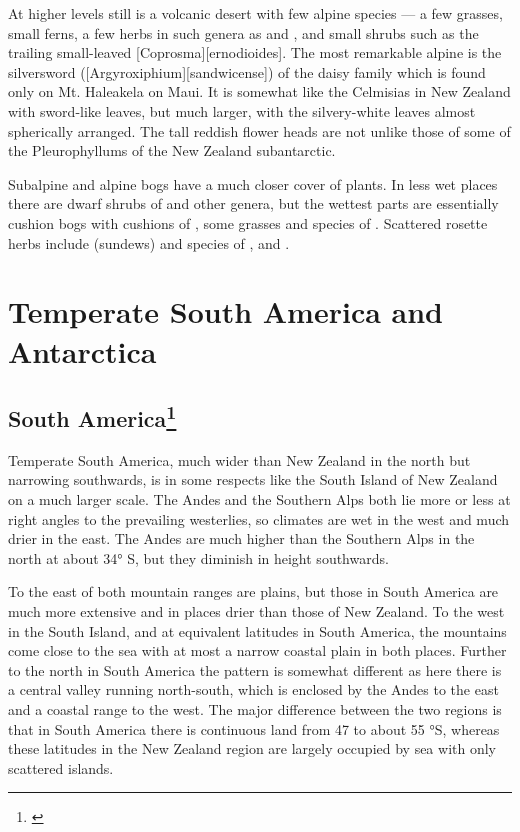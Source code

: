 At higher levels still is a volcanic desert with few alpine species --- a few grasses, small ferns, a few herbs in such genera as  and , and small shrubs such as the trailing small-leaved [Coprosma][ernodioides].
The most remarkable alpine is the silversword ([Argyroxiphium][sandwicense]) of the daisy family which is found only on Mt.
Haleakela on Maui.
It is somewhat like the Celmisias in New Zealand with sword-like leaves, but much larger, with the silvery-white leaves almost spherically arranged.
The tall reddish flower heads are not unlike those of some of the Pleurophyllums of the New Zealand subantarctic.

Subalpine and alpine bogs have a much closer cover of plants.
In less wet places there are dwarf shrubs of  and other genera, but the wettest parts are essentially cushion bogs with cushions of , some grasses and species of .
Scattered rosette herbs include  (sundews) and species of ,  and .

\section{Temperate South America and Antarctica}

\subsection[South America]{South America\footnote{\cite{godley1960botany}}}

Temperate South America, much wider than New Zealand in the north but narrowing southwards, is in some respects like the South Island of New Zealand on a much larger scale.
The Andes and the Southern Alps both lie more or less at right angles to the prevailing westerlies, so climates are wet in the west and much drier in the east.
The Andes are much higher than the Southern Alps in the north at about 34° S, but they diminish in height southwards.

To the east of both mountain ranges are plains, but those in South America are much more extensive and in places drier than those of New Zealand.
To the west in the South Island, and at equivalent latitudes in South America, the mountains come close to the sea with at most a narrow coastal plain in both places.
Further to the north in South America the pattern is somewhat different as here there is a central valley running north-south, which is enclosed by the Andes to the east and a coastal range to the west.
The major difference between the two regions is that in South America there is continuous land from 47 to about 55 °S, whereas these latitudes in the New Zealand region are largely occupied by sea with only scattered islands.

